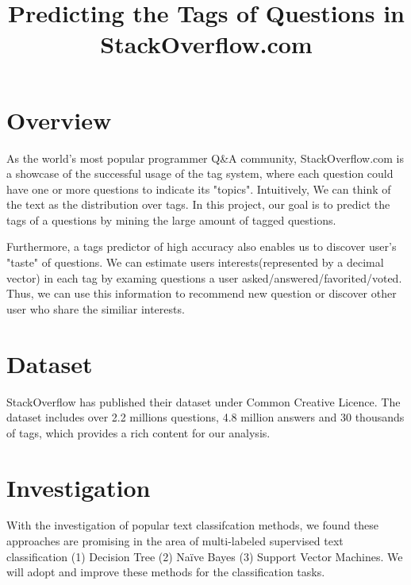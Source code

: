 \documentclass{article} %
\title{Predicting the Tags of Questions in StackOverflow.com}
\begin{document}
\maketitle
\section{Overview}
As the world's most popular programmer Q\&A community, StackOverflow.com  is a showcase of the successful usage of the tag system, where each question could have one or more questions to indicate its "topics". Intuitively, We can think of the text as the distribution over tags.
 In this project, our goal is to predict the tags of a questions by mining the large amount of tagged questions.  

Furthermore, a tags predictor of high accuracy also enables us to discover user's "taste" of questions. We can estimate users interests(represented by a decimal vector) in each tag by examing questions a user asked/answered/favorited/voted. Thus, we can use this information to recommend new question or discover other user who share the similiar interests.

\section{Dataset}
StackOverflow has published their dataset under Common Creative Licence. The dataset includes over 2.2 millions questions, 4.8 million answers and 30 thousands of tags, which provides a rich content for our analysis.

\section{Investigation}
With the investigation of popular text classifcation methods, we found these approaches are promising in the area of multi-labeled supervised text classification (1) Decision Tree (2) Naïve Bayes (3) Support Vector Machines. We will adopt and improve these methods for the classification tasks.
\end{document}
